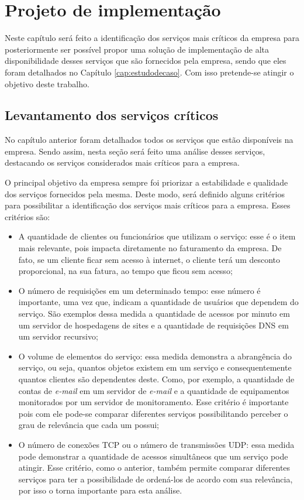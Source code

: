 \chapter{Projeto de implementação}
\label{cap:projetoimplementacao}

Neste capítulo será feito a identificação dos serviços mais críticos da empresa para posteriormente ser possível propor uma solução de 
implementação de alta disponibilidade desses serviços que são fornecidos pela empresa, sendo que eles foram detalhados no Capítulo 
\ref{cap:estudodecaso}. Com isso pretende-se atingir o objetivo deste trabalho.

\section{Levantamento dos serviços críticos}
\label{section:servcrit}

No capítulo anterior foram detalhados todos os serviços que estão disponíveis na empresa. Sendo assim, nesta seção será feito uma análise desses
serviços, destacando os serviços considerados mais críticos para a empresa. 

O principal objetivo da empresa sempre foi priorizar a estabilidade e qualidade dos serviços fornecidos pela mesma. Deste modo, será definido 
alguns critérios para possibilitar a identificação dos serviços mais críticos para a empresa. Esses critérios são:
\begin{itemize}
 \item A quantidade de clientes ou funcionários que utilizam o serviço: esse é o item mais relevante, pois impacta diretamente no faturamento
 da empresa. De fato, se um cliente ficar sem acesso à internet, o cliente terá um desconto proporcional, na sua fatura, ao tempo que ficou sem 
 acesso; 
 \item O número de requisições em um determinado tempo: esse número é importante, uma vez que, indicam a quantidade de usuários que dependem do 
 serviço. São exemplos dessa medida a quantidade de acessos por minuto em um servidor de hospedagens de sites e a quantidade de requisições 
 \ac{DNS} em um servidor recursivo;
 \item O volume de elementos do serviço: essa medida demonstra a abrangência do serviço, ou seja, quantos objetos existem em um serviço e 
 consequentemente quantos clientes são dependentes deste. Como, por exemplo, a quantidade de contas de \textit{e-mail} em um servidor de 
 \textit{e-mail} e a quantidade de equipamentos monitorados por um servidor de monitoramento. Esse critério é importante pois com ele pode-se
 comparar diferentes serviços possibilitando perceber o grau de relevância que cada um possui;
 \item O número de conexões \ac{TCP} ou o número de transmissões \ac{UDP}: essa medida pode demonstrar a quantidade de acessos simultâneos que um
 serviço pode atingir. Esse critério, como o anterior, também permite comparar diferentes serviços para ter a possibilidade de ordená-los de acordo 
 com sua relevância, por isso o torna importante para esta análise.
\end{itemize}

